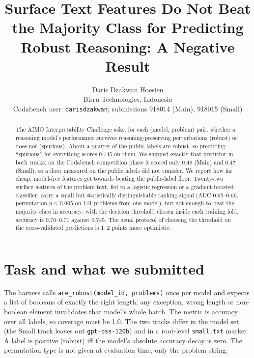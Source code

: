 \documentclass{article}
\title{Surface Text Features Do Not Beat the Majority Class for Predicting Robust Reasoning: A Negative Result}
\author{Daris Dzakwan Hoesien\\Birru Technologies, Indonesia\\ Codabench user: \texttt{darisdzakwan}; submissions 918014 (Main), 918015 (Small)}
\date{}
\begin{document}
\maketitle

\begin{abstract}
The AIMO Interpretability Challenge asks, for each (model, problem) pair, whether a reasoning model's performance survives reasoning-preserving perturbations (robust) or does not (spurious).
About a quarter of the public labels are robust, so predicting ``spurious'' for everything scores 0.745 on them.
We shipped exactly that predictor in both tracks; on the Codabench competition phase it scored only 0.48 (Main) and 0.47 (Small), so a floor measured on the public labels did not transfer.
We report how far cheap, model-free features get towards beating the public-label floor.
Twenty-two surface features of the problem text, fed to a logistic regression or a gradient-boosted classifier, carry a small but statistically distinguishable ranking signal (AUC 0.65--0.66, permutation $p\le0.005$ on 141 problems from one model), but not enough to beat the majority class in accuracy: with the decision threshold chosen inside each training fold, accuracy is 0.70--0.71 against 0.745.
The usual protocol of choosing the threshold on the cross-validated predictions is 1--2 points more optimistic.
\end{abstract}

\section{Task and what we submitted}
The harness calls \texttt{are\_robust(model\_id, problems)} once per model and expects a list of booleans of exactly the right length; any exception, wrong length or non-boolean element invalidates that model's whole batch.
The metric is accuracy over all labels, so coverage must be 1.0. The two tracks differ in the model set (the Small track leaves out \texttt{gpt-oss-120b}) and in a root-level \texttt{small.txt} marker.
A label is positive (robust) iff the model's absolute accuracy decay is zero. The permutation type is not given at evaluation time, only the problem string.
\end{document}
